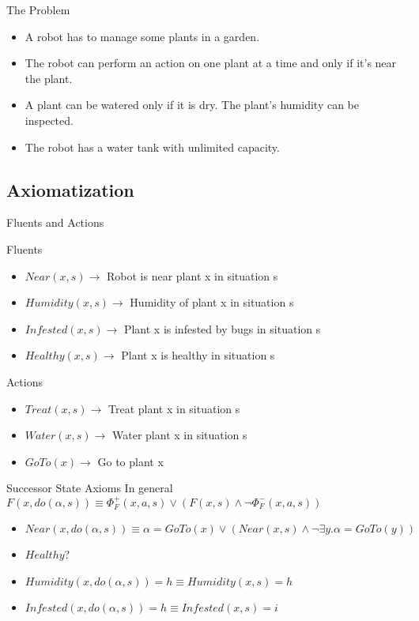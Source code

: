 
\begin{frame}{The Problem}
    \begin{itemize}
        \item A robot has to manage some plants in a garden.
        \item The robot can perform an action on one plant at a time and only if it's near the plant.
        \item A plant can be watered only if it is dry. The plant's humidity can be inspected.
        \item The robot has a water tank with unlimited capacity.
    \end{itemize}
\end{frame}

\subsection{Axiomatization}

\begin{frame}[fragile]{Fluents and Actions}
    \begin{block}{Fluents}
        \begin{itemize}
            \item $Near(x,s) \rightarrow$ Robot is near plant x in situation s
            \item $Humidity(x,s) \rightarrow$ Humidity of plant x in situation s
            \item $Infested(x,s) \rightarrow$ Plant x is infested by bugs in situation s
            \item $Healthy(x,s) \rightarrow$ Plant x is healthy in situation s
        \end{itemize}
    \end{block}
    \begin{block}{Actions}
        \begin{itemize}
            \item $Treat(x,s) \rightarrow$ Treat plant x in situation s
            \item $Water(x,s) \rightarrow$ Water plant x in situation s
            \item $GoTo(x) \rightarrow$ Go to plant x
        \end{itemize}
    \end{block}
\end{frame}

\begin{frame}{Successor State Axioms}
    In general $F(x,do(\alpha,s)) \equiv \Phi_F^+(x,a,s) \lor (F(x,s) \land \neg \Phi_F^-(x,a,s))$
    \vspace*{0.5cm}
    \begin{itemize}
        \item $Near(x,do(\alpha,s)) \equiv \alpha = GoTo(x) \lor \left( Near(x,s) \land \neg \exists y.\alpha=GoTo(y)\right)$
        \item $Healthy$?
        \item $Humidity(x,do(\alpha,s))=h \equiv Humidity(x,s)=h$
        \item $Infested(x,do(\alpha,s))=h \equiv Infested(x,s)=i$
    \end{itemize}
\end{frame}

